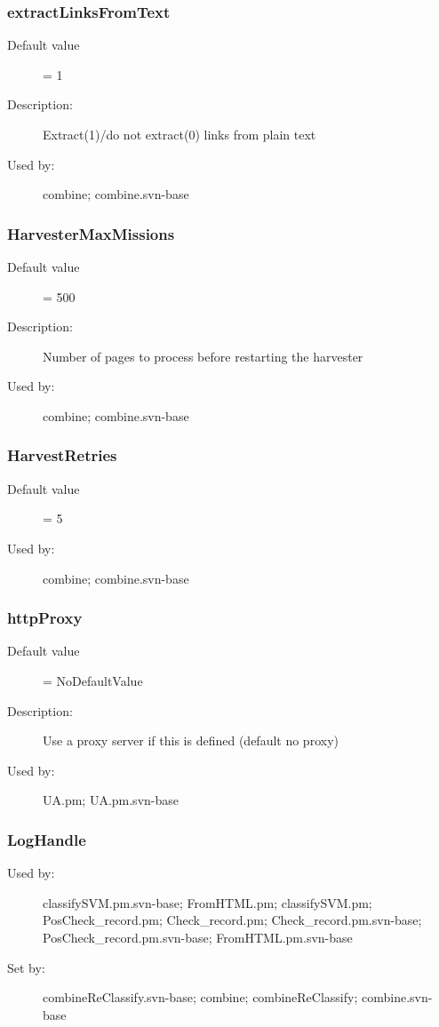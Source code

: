 \subsubsection{extractLinksFromText}
\label{extractLinksFromText}
\begin{description}
\item[Default value] = 1
\item[Description:] Extract(1)/do not extract(0) links from plain text
\item[Used by:] combine; combine.svn-base
\end{description}
\subsubsection{HarvesterMaxMissions}
\label{HarvesterMaxMissions}
\begin{description}
\item[Default value] = 500
\item[Description:] Number of pages to process before restarting the harvester
\item[Used by:] combine; combine.svn-base
\end{description}
\subsubsection{HarvestRetries}
\label{HarvestRetries}
\begin{description}
\item[Default value] = 5
\item[Used by:] combine; combine.svn-base
\end{description}
\subsubsection{httpProxy}
\label{httpProxy}
\begin{description}
\item[Default value] = NoDefaultValue
\item[Description:] Use a proxy server if this is defined (default no proxy)
\item[Used by:] UA.pm; UA.pm.svn-base
\end{description}
\subsubsection{LogHandle}
\label{LogHandle}
\begin{description}
\item[Used by:] classifySVM.pm.svn-base; FromHTML.pm; classifySVM.pm; PosCheck\_record.pm; Check\_record.pm; Check\_record.pm.svn-base; PosCheck\_record.pm.svn-base; FromHTML.pm.svn-base
\item[Set by:] combineReClassify.svn-base; combine; combineReClassify; combine.svn-base
\end{description}
